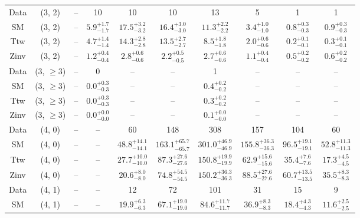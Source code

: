 \begin{table}[h!]
{\begin{tabular}{cccccccccc}
	Data & (3, 2) & -- & 10 & 10 & 10 & 13 & 5 & 1 & 1 \\[0.5ex] 
	SM & (3, 2) & -- & $5.9^{+ 1.7 }_{- 1.7 }$ & $17.5^{+ 3.2 }_{- 3.2 }$ & $16.4^{+ 3.0 }_{- 3.0 }$ & $11.3^{+ 2.2 }_{- 2.2 }$ & $3.4^{+ 1.0 }_{- 1.0 }$ & $0.8^{+ 0.3 }_{- 0.3 }$ & $0.9^{+ 0.3 }_{- 0.3 }$ \\[0.5ex] 
	Ttw & (3, 2) & -- & $4.7^{+ 1.4 }_{- 1.4 }$ & $14.3^{+ 2.8 }_{- 2.8 }$ & $13.5^{+ 2.7 }_{- 2.7 }$ & $8.5^{+ 1.8 }_{- 1.8 }$ & $2.0^{+ 0.6 }_{- 0.6 }$ & $0.2^{+ 0.1 }_{- 0.1 }$ & $0.3^{+ 0.1 }_{- 0.1 }$ \\[0.5ex] 
	Zinv & (3, 2) & -- & $1.2^{+ 0.4 }_{- 0.4 }$ & $2.8^{+ 0.6 }_{- 0.6 }$ & $2.2^{+ 0.5 }_{- 0.5 }$ & $2.7^{+ 0.6 }_{- 0.6 }$ & $1.1^{+ 0.4 }_{- 0.4 }$ & $0.5^{+ 0.2 }_{- 0.2 }$ & $0.6^{+ 0.2 }_{- 0.2 }$ \\[0.5ex] 
	Data & (3, $\ge3$) & -- & 0 & -- & -- & 1 & -- & -- & -- \\[0.5ex] 
	SM & (3, $\ge3$) & -- & $0.0^{+ 0.3 }_{- 0.3 }$ & -- & -- & $0.4^{+ 0.2 }_{- 0.2 }$ & -- & -- & -- \\[0.5ex] 
	Ttw & (3, $\ge3$) & -- & $0.0^{+ 0.3 }_{- 0.3 }$ & -- & -- & $0.3^{+ 0.2 }_{- 0.2 }$ & -- & -- & -- \\[0.5ex] 
	Zinv & (3, $\ge3$) & -- & $0.0^{+ 0.0 }_{- 0.0 }$ & -- & -- & $0.1^{+ 0.0 }_{- 0.0 }$ & -- & -- & -- \\[0.5ex] 
	Data & (4, 0) & -- & -- & 60 & 148 & 308 & 157 & 104 & 60 \\[0.5ex] 
	SM & (4, 0) & -- & -- & $48.8^{+ 14.1 }_{- 14.1 }$ & $163.1^{+ 65.7 }_{- 65.7 }$ & $301.0^{+ 46.9 }_{- 46.9 }$ & $155.8^{+ 36.3 }_{- 36.3 }$ & $96.5^{+ 19.1 }_{- 19.1 }$ & $52.8^{+ 11.3 }_{- 11.3 }$ \\[0.5ex] 
	Ttw & (4, 0) & -- & -- & $27.7^{+ 10.0 }_{- 10.0 }$ & $87.3^{+ 27.6 }_{- 27.6 }$ & $150.8^{+ 19.9 }_{- 19.9 }$ & $62.9^{+ 15.6 }_{- 15.6 }$ & $35.4^{+ 7.6 }_{- 7.6 }$ & $17.3^{+ 4.5 }_{- 4.5 }$ \\[0.5ex] 
	Zinv & (4, 0) & -- & -- & $20.6^{+ 8.0 }_{- 8.0 }$ & $74.8^{+ 54.5 }_{- 54.5 }$ & $150.2^{+ 36.3 }_{- 36.3 }$ & $88.5^{+ 27.6 }_{- 27.6 }$ & $60.7^{+ 13.5 }_{- 13.5 }$ & $35.5^{+ 8.3 }_{- 8.3 }$ \\[0.5ex] 
	Data & (4, 1) & -- & -- & 12 & 72 & 101 & 31 & 15 & 9 \\[0.5ex] 
	SM & (4, 1) & -- & -- & $19.9^{+ 6.3 }_{- 6.3 }$ & $67.1^{+ 19.0 }_{- 19.0 }$ & $84.6^{+ 11.7 }_{- 11.7 }$ & $36.9^{+ 8.3 }_{- 8.3 }$ & $18.4^{+ 4.3 }_{- 4.3 }$ & $11.6^{+ 2.5 }_{- 2.5 }$ \\[0.5ex] 

\end{tabular}}
\end{table}
